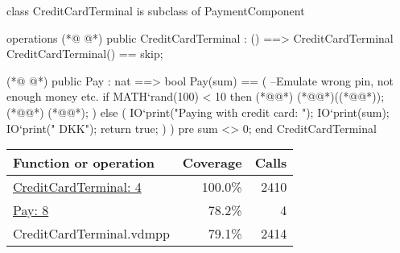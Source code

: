 \begin{vdmpp}
class CreditCardTerminal is subclass of PaymentComponent

operations
(*@
\label{CreditCardTerminal:4}
@*)
 public CreditCardTerminal : () ==> CreditCardTerminal
 CreditCardTerminal() ==
  skip;
  
(*@
\label{Pay:8}
@*)
 public Pay : nat ==> bool
 Pay(sum) ==
 (
 --Emulate wrong pin, not enough money etc.
  if MATH`rand(100) < 10 then 
  (*@\vdmnotcovered{(}@*)
   (*@@*)((*@@*));
   (*@@*) (*@@*);
  ) else 
  (  
   IO`print("Paying with credit card: ");
   IO`print(sum);
   IO`print(" DKK\n");
   return true;
  )
 )
 pre sum <> 0;
end CreditCardTerminal
\end{vdmpp}
\bigskip
\begin{longtable}{|l|r|r|}
\hline
Function or operation & Coverage & Calls \\
\hline
\hline
\hyperref[CreditCardTerminal:4]{CreditCardTerminal: 4} & 100.0\% & 2410 \\
\hline
\hyperref[Pay:8]{Pay: 8} & 78.2\% & 4 \\
\hline
\hline
CreditCardTerminal.vdmpp & 79.1\% & 2414 \\
\hline
\end{longtable}

